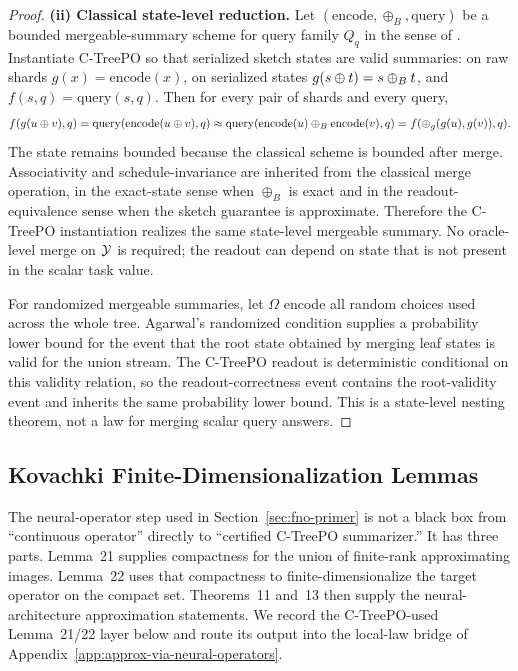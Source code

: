\begin{proof}
\textbf{(ii) Classical state-level reduction.}
Let $(\mathrm{encode},\oplus_B,\mathrm{query})$ be a bounded mergeable-summary
scheme for query family $Q_q$ in the sense of
\citet{Agarwal2013MergeableTODS}. Instantiate C-TreePO so that serialized
sketch states are valid summaries: on raw shards $g(x)=\mathrm{encode}(x)$,
on serialized states $g(s\oplus t)=s\oplus_B t$, and
$f(s,q)=\mathrm{query}(s,q)$. Then for every pair of shards and every query,
\[
f(g(u\oplus v),q)
  = \mathrm{query}(\mathrm{encode}(u\oplus v),q)
  \approx
    \mathrm{query}(\mathrm{encode}(u)\oplus_B\mathrm{encode}(v),q)
  = f(\oplus_g(g(u),g(v)),q).
\]
The state remains bounded because the classical scheme is bounded after
merge. Associativity and schedule-invariance are inherited from the classical
merge operation, in the exact-state sense when $\oplus_B$ is exact and in the
readout-equivalence sense when the sketch guarantee is approximate. Therefore
the C-TreePO instantiation realizes the same state-level mergeable summary.
No oracle-level merge on $\mathcal{Y}$ is required; the readout can depend on state
that is not present in the scalar task value.

For randomized mergeable summaries, let $\Omega$ encode all random choices used
across the whole tree. Agarwal's randomized condition supplies a probability
lower bound for the event that the root state obtained by merging leaf states
is valid for the union stream. The C-TreePO readout is deterministic conditional
on this validity relation, so the readout-correctness event contains the
root-validity event and inherits the same probability lower bound. This is a
state-level nesting theorem, not a law for merging scalar query answers.
\end{proof}

\subsection{Kovachki Finite-Dimensionalization Lemmas}\label{app:kovachki-finite-dimensionalization}

The neural-operator step used in Section~\ref{sec:fno-primer} is not a
black box from ``continuous operator'' directly to ``certified
C-TreePO summarizer.'' It has three parts. Lemma~21 supplies compactness
for the union of finite-rank approximating images. Lemma~22 uses that
compactness to finite-dimensionalize the target operator on the compact
set. Theorems~11 and~13 then supply the neural-architecture
approximation statements. We record the C-TreePO-used Lemma~21/22 layer
below and route its output into the local-law bridge of
Appendix~\ref{app:approx-via-neural-operators}.

